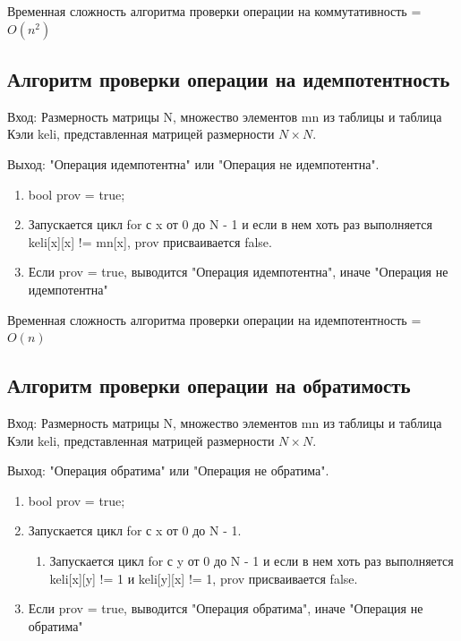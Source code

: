 \documentclass[bachelor, och, labwork]{shiza}
\begin{document}
	Временная сложность алгоритма проверки операции на коммутативность = $O(n^2)$	
	
	\subsection{Алгоритм проверки операции на идемпотентность}
	
	$\textit{Вход:}$ Размерность матрицы N, множество элементов mn из таблицы и таблица Кэли keli, представленная матрицей размерности $N \times N$.
	
	$\textit{Выход:}$  "Операция идемпотентна" или "Операция не идемпотентна".
	
	\begin{enumerate} 
		\item bool prov = true;
		\item Запускается цикл for с x от 0 до N - 1 и если в нем хоть раз выполняется keli[x][x] != mn[x], prov присваивается false.
		\item Если prov = true, выводится "Операция идемпотентна", иначе "Операция не идемпотентна"
	\end{enumerate} 

	Временная сложность алгоритма проверки операции на идемпотентность = $O(n)$		
	
	\subsection{Алгоритм проверки операции на обратимость}	
	
	$\textit{Вход:}$ Размерность матрицы N, множество элементов mn из таблицы и таблица Кэли keli, представленная матрицей размерности $N \times N$.

	$\textit{Выход:}$  "Операция обратима" или "Операция не обратима".	
		
	\begin{enumerate} 
		\item bool prov = true;
		\item Запускается цикл for с x от 0 до N - 1.
		\begin{enumerate} 
			\item Запускается цикл for с y от 0 до N - 1 и если в нем хоть раз выполняется keli[x][y] != 1 и keli[y][x] != 1, prov присваивается false.
		\end{enumerate}
		\item Если prov = true, выводится "Операция обратима", иначе "Операция не обратима"
	\end{enumerate} 
	
\end{document}
